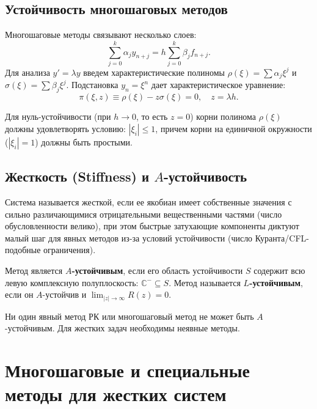 \documentclass[12pt,a4paper]{article}
\begin{document}
\subsection{Устойчивость многошаговых методов}
Многошаговые методы связывают несколько слоев:
\begin{equation}
    \sum_{j=0}^k \alpha_j y_{n+j} = h \sum_{j=0}^k \beta_j f_{n+j}.
\end{equation}
Для анализа $y'=\lambda y$ введем характеристические полиномы $\rho(\xi) = \sum \alpha_j \xi^j$ и $\sigma(\xi) = \sum \beta_j \xi^j$. Подстановка $y_n = \xi^n$ дает характеристическое уравнение:
\begin{equation}
    \pi(\xi, z) \equiv \rho(\xi) - z \sigma(\xi) = 0, \quad z = \lambda h.
\end{equation}

\begin{definition}
Для нуль-устойчивости (при $h \to 0$, то есть $z=0$) корни полинома $\rho(\xi)$ должны удовлетворять условию: $|\xi_i| \le 1$, причем корни на единичной окружности ($|\xi_i| = 1$) должны быть простыми.
\end{definition}

\subsection{Жесткость (Stiffness) и $A$-устойчивость}
\begin{definition}
Система называется жесткой, если ее якобиан имеет собственные значения с сильно различающимися отрицательными вещественными частями (число обусловленности велико), при этом быстрые затухающие компоненты диктуют малый шаг для явных методов из-за условий устойчивости (число Куранта/CFL-подобные ограничения).
\end{definition}

\begin{definition}
Метод является \textbf{$A$-устойчивым}, если его область устойчивости $S$ содержит всю левую комплексную полуплоскость: $\mathbb{C}^- \subseteq S$. 
Метод называется \textbf{$L$-устойчивым}, если он $A$-устойчив и $\lim_{|z|\to\infty} R(z) = 0$.
\end{definition}
Ни один явный метод РК или многошаговый метод не может быть $A$-устойчивым. Для жестких задач необходимы неявные методы.

\section{Многошаговые и специальные методы для жестких систем}
\end{document}
